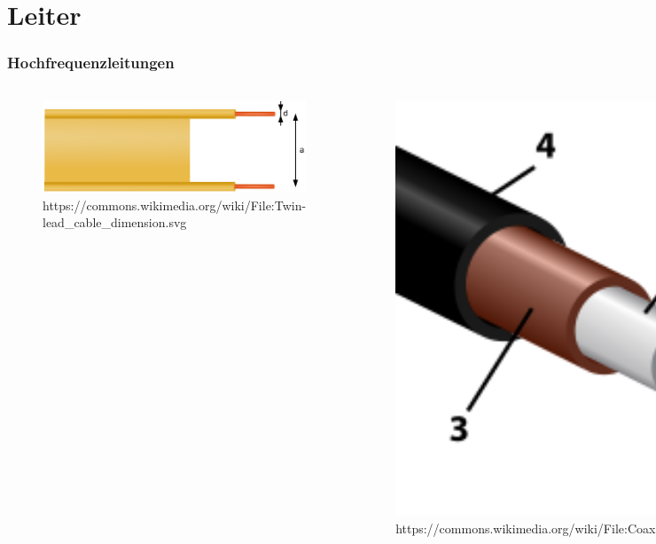 \section*{Leiter}
\begin{frame}
  \frametitle{Hochfrequenzleitungen}
  \begin{center}
    \begin{columns}
      \begin{center}
        \begin{figure}
          \includegraphics[width=1\textwidth,height=.5\textwidth,keepaspectratio]{e10/parallel.png}
                        {https://commons.wikimedia.org/wiki/File:Twin-lead_cable_dimension.svg}{\ccbysa}
        \end{figure}
      \end{center}
      \begin{center}
        \begin{figure}
          \includegraphics[width=1\textwidth,height=.5\textwidth,keepaspectratio]{e10/coax.png}
                  {https://commons.wikimedia.org/wiki/File:Coaxial_cable_cutaway_new.svg}{\ccby}
        \end{figure}
      \end{center}
    \end{columns}
  \end{center}
\end{frame}

